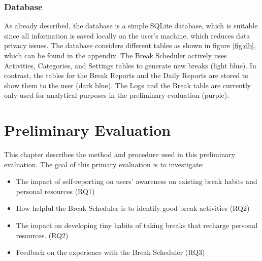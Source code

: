 \documentclass{hasel_thesis}
\begin{document}
\subsection{Database} \label{database}
As already described, the database is a simple SQLite database, which is suitable since all information is saved locally on the user's machine, which reduces data privacy issues. The database considers different tables as shown in figure \ref{fig:db}, which can be found in the appendix. The Break Scheduler actively uses Activities, Categories, and Settings tables to generate new breaks (light blue). In contrast, the tables for the Break Reports and the Daily Reports are stored to show them to the user (dark blue). The Logs and the Break table are currently only used for analytical purposes in the preliminary evaluation (purple).

\chapter{Preliminary Evaluation} \label{primary_evaluation}
This chapter describes the method and procedure used in this preliminary evaluation. The goal of this primary evaluation is to investigate:

\begin{itemize}
    \item The impact of self-reporting on users' awareness on existing break habits and personal resources (RQ1)
    \item How helpful the Break Scheduler is to identify good break activities (RQ2)
    \item The impact on developing tiny habits of taking breaks that recharge personal resources. (RQ2)
    \item Feedback on the experience with the Break Scheduler (RQ3)
\end{itemize}
\end{document}
